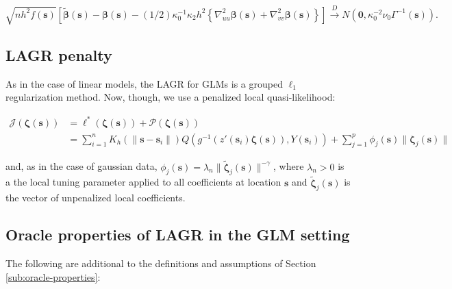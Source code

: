 \documentclass[english]{article}\usepackage[]{graphicx}\usepackage[]{color}
\theoremstyle{plain}
\theoremstyle{plain}
\begin{document}
\[
\sqrt{{nh^{2}f(\bm{{s}})}}\left[\tilde{\bm{\beta}}(\bm{s})-\bm{\beta}(\bm{s})-(1/2)\kappa_{0}^{-1}\kappa_{2}h^{2}\left\{ \nabla_{uu}^{2}\bm{\beta}(\bm{s})+\nabla_{vv}^{2}\bm{\beta}(\bm{s})\right\} \right]\xrightarrow{{D}}N\left(\bm{0},\kappa_{0}^{-2}\nu_{0}\Gamma^{-1}(\bm{s})\right).
\]



\subsection{LAGR penalty}

As in the case of linear models, the LAGR for GLMs is a grouped $\ell_{1}$
regularization method. Now, though, we use a penalized local quasi-likelihood:

\begin{align}
\mathcal{J}\left(\bm{\zeta}(\bm{s})\right) & =\mathcal{\ell}^{*}\left(\bm{\zeta}(\bm{s})\right)+\mathcal{P}\left(\bm{\zeta}(\bm{s})\right)\label{eq:adaptive-lasso-GLLM}\\
 & =\sum_{i=1}^{n}K_{h}\left(\|\bm{s}-\bm{s}_{i}\|\right)Q\left(g^{-1}\left(z'(\bm{s}_{i})\bm{\zeta}(\bm{s})\right),Y(\bm{s}_{i})\right)+\sum_{j=1}^{p}\phi_{j}\left(\bm{s}\right)\|\bm{\zeta}_{j}\left(\bm{s}\right)\|
\end{align}


and, as in the case of gaussian data, $\phi_{j}\left(\bm{s}\right)=\lambda_{n}\|\tilde{\bm{\zeta}}_{j}\left(\bm{s}\right)\|^{-\gamma}$,
where $\lambda_{n}>0$ is a the local tuning parameter applied to
all coefficients at location $\bm{s}$ and $\tilde{\bm{\zeta}}_{j}\left(\bm{s}\right)$
is the vector of unpenalized local coefficients.


\subsection{Oracle properties of LAGR in the GLM setting}

The following are additional to the definitions and assumptions of
Section \ref{sub:oracle-properties}:
\end{document}
